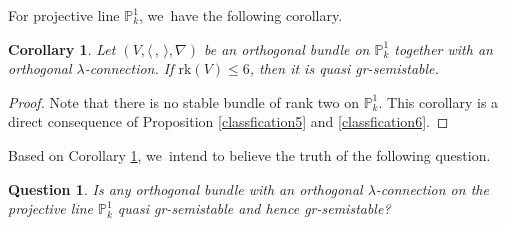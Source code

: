 \documentclass[JEP,XML,SOM,Unicode,published]{cedram}
\newcommand{\lconnection}{$\lambda$\nobreakdash-con\-nec\-tion\xspace}
\newcommand{\grsemistable}{gr\nobreakdash-semi\-stable\xspace}
\newcommand{\PP}{{\mathbb P}}
\newcommand{\rk}{\mathrm{rk}}
\theoremstyle{plain}
\newtheorem{cor}[thm]{Corollary}
\newtheorem{ques}[thm]{Question}
\theoremstyle{definition}
\begin{document}
For projective line $\mathbb{P}^1_k$, we~have the following corollary. 
\begin{cor}\label{proline5}
Let $(V,\langle \,, \, \rangle,\nabla)$ be an orthogonal bundle on $\mathbb{P}^1_k$ together with an orthogonal \lconnection. If $\rk(V) \leq 6$, then it is quasi \grsemistable.
\end{cor}

\begin{proof}
Note that there is no stable bundle of rank two on $\mathbb{P}^1_k$. This corollary is a direct consequence of Proposition \ref{classfication5} and \ref{classfication6}.
\end{proof}

Based on Corollary \ref{proline5}, we~intend to believe the truth of the following question.

\begin{ques}
Is any orthogonal bundle with an orthogonal \lconnection on the projective line $\PP^1_k$ quasi \grsemistable and hence \grsemistable?
\end{ques}\label{prolineconj}

\backmatter 


\end{document}
